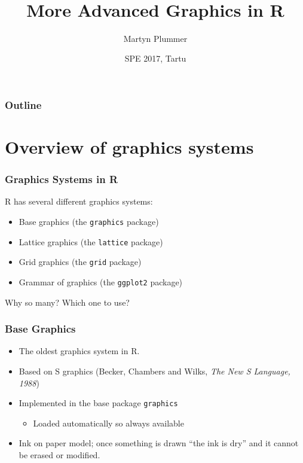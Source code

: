 \documentclass[xcolor=svgnames]{beamer}
\title{~\\ ~\\ ~\\ More Advanced Graphics in R}
\author[Martyn Plummer]
{Martyn Plummer}
\institute[IARC] %
{
  International Agency for Research on Cancer\\
  Lyon, France
}
\date[SPE 2017] %
{SPE 2017, Tartu}
\newcommand{\code}[1]{\texttt{#1}}
\begin{document}
{%
\begin{frame}[plain]
  \titlepage
\end{frame}
}

\begin{frame}
  \frametitle{Outline}
  \tableofcontents
\end{frame}

\section{Overview of graphics systems}

\begin{frame}
  \frametitle{Graphics Systems in R}  

  R has several different graphics systems: 
  \begin{itemize}
  \item Base graphics (the \code{graphics} package)
  \item Lattice graphics (the \code{lattice} package)
  \item Grid graphics (the \code{grid} package)
  \item Grammar of graphics (the \code{ggplot2} package)
  \end{itemize}
  Why so many? Which one to use?
  
\end{frame}

\begin{frame}
  \frametitle{Base Graphics}
  \begin{itemize}
  \item The oldest graphics system in R.
  \item Based on S graphics (Becker, Chambers and Wilks, 
    {\em The New S Language, 1988})
  \item Implemented in the base package \code{graphics} 
    \begin{itemize}
    \item Loaded automatically so always available
    \end{itemize}
  \item Ink on paper model; once something is drawn ``the ink is dry'' and it 
    cannot be erased or modified.
  \end{itemize}
\end{frame}
\end{document}

